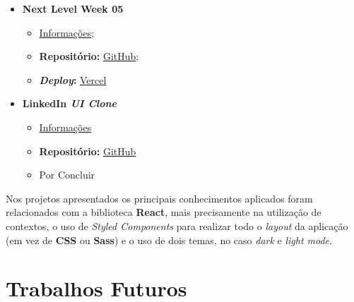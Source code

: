 \begin{minipage}[t]{0.45\textwidth}
	\begin{itemize}
		\item \textbf{Next Level Week 05}
			\begin{itemize}
				\item \href{http://nextlevelweek.com/}{Informações};
				\item \textbf{Repositório:} \href{https://github.com/TutoDS/nlw05-react}{GitHub};
				\item \textbf{\textit{Deploy}:} \href{https://podcastr-tutods.vercel.app/}{Vercel}
			\end{itemize}

		\item \textbf{LinkedIn \textit{UI Clone}}
			\begin{itemize}
				\item \href{https://www.youtube.com/watch?v=xP3cxbDUtrc}{Informações}
				\item \textbf{Repositório:} \href{https://github.com/TutoDS/reactjs-linkedin-clone}{GitHub}
				\item Por Concluir
			\end{itemize}
	\end{itemize}
\end{minipage}

\vspace{10pt}

Nos projetos apresentados os principais conhecimentos aplicados foram relacionados com a biblioteca \textbf{React}, mais precisamente na utilização de contextos, o uso de \textit{Styled Components} para realizar todo o \textit{layout} da aplicação (em vez de \textbf{CSS} ou \textbf{Sass}) e o uso de dois temas, no caso \textit{dark} e \textit{light mode}.

\section{Trabalhos Futuros}